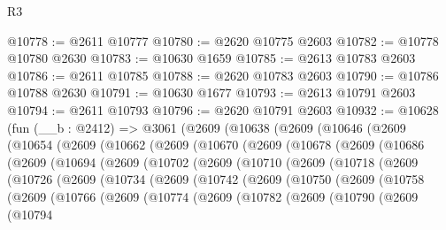 \begin{lexlean}{R3}
\begin{coremodule}
@10778 := @2611 @10777
@10780 := @2620 @10775 @2603
@10782 := @10778 @10780 @2630
@10783 := @10630 @1659
@10785 := @2613 @10783 @2603
@10786 := @2611 @10785
@10788 := @2620 @10783 @2603
@10790 := @10786 @10788 @2630
@10791 := @10630 @1677
@10793 := @2613 @10791 @2603
@10794 := @2611 @10793
@10796 := @2620 @10791 @2603
@10932 := @10628
    (fun (__b : @2412) =>
    @3061
      (@2609
        (@10638
          (@2609
            (@10646
              (@2609
                (@10654
                  (@2609
                    (@10662
                      (@2609
                        (@10670
                          (@2609
                            (@10678
                              (@2609
                                (@10686
                                  (@2609
                                    (@10694
                                      (@2609
                                        (@10702
                                          (@2609
                                            (@10710
                                              (@2609
                                                (@10718
                                                  (@2609
                                                    (@10726
                                                      (@2609
                                                        (@10734
                                                          (@2609
                                                            (@10742
                                                              (@2609
                                                                (@10750
                                                                  (@2609
                                                                    (@10758
                                                                      (@2609
                                                                        (@10766
                                                                          (@2609
                                                                            (@10774
                                                                              (@2609
                                                                                (@10782
                                                                                  (@2609
                                                                                    (@10790
                                                                                      (@2609
                                                                                        (@10794

\end{coremodule}
\end{lexlean}
